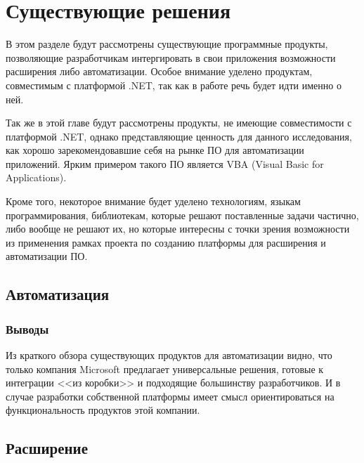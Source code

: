 \section{Существующие решения}

В этом разделе будут рассмотрены существующие программные продукты, позволяющие разработчикам интергировать в свои приложения возможности расширения либо автоматизации. Особое внимание уделено продуктам, совместимым с платформой .NET, так как в работе речь будет идти именно о ней.

Так же в этой главе будут рассмотрены продукты, не имеющие совместимости с платформой .NET, однако представляющие ценность для данного исследования, как хорошо зарекомендовавшие себя на рынке ПО для автоматизации приложений. Ярким примером такого ПО является VBA (Visual Basic for Applications).

Кроме того, некоторое внимание будет уделено технологиям, языкам программирования, библиотекам, которые решают поставленные задачи частично, либо вообще не решают их, но которые интересны с точки зрения возможности из применения рамках проекта по созданию платформы для расширения и автоматизации ПО.

\subsection{Автоматизация}







\subsubsection{Выводы}

Из краткого обзора существующих продуктов для автоматизации видно, что только компания Microsoft предлагает универсальные решения, готовые к интеграции <<из коробки>> и подходящие большинству разработчиков. И в случае разработки собственной платформы имеет смысл ориентироваться на функциональность продуктов этой компании.

\subsection{Расширение}







